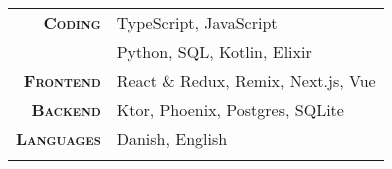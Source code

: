 \documentclass[10pt,a4paper,ragged2e,dvipsnames]{altacv}
\begin{document}


    \smallskip
    \begin{tabular}{rl}
      \makeatletter
      \textsc{\textbf{Coding}} & TypeScript, JavaScript \\
      & Python, SQL, Kotlin, Elixir \\
      \textsc{\textbf{Frontend}} & React \& Redux, Remix, Next.js, Vue \\
      \textsc{\textbf{Backend}} & Ktor, Phoenix, Postgres, SQLite \\
      \textsc{\textbf{Languages}} & Danish, English \\
      \makeatother
    \end{tabular}







    \clearpage


    \nocite{*}







  
\end{document}
